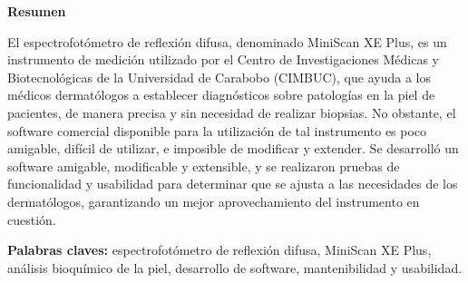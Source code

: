 \begin{center}
	\membrete
	\vfill
	\textbf{Resumen}
\end{center}

	\noindent
El espectrofot\'{o}metro de reflexi\'{o}n difusa, denominado MiniScan XE Plus, es un instrumento de medici\'{o}n utilizado por el Centro de Investigaciones M\'{e}dicas y Biotecnol\'{o}gicas de la Universidad de Carabobo (CIMBUC), que ayuda a los m\'{e}dicos dermat\'{o}logos a establecer diagn\'{o}sticos sobre patolog\'{i}as en la piel de pacientes, de manera precisa y sin necesidad de realizar biopsias. No obstante, el software comercial disponible para la utilizaci\'{o}n de tal instrumento es poco amigable, dif\'{i}cil de utilizar, e imposible de modificar y extender. Se desarroll\'{o} un software amigable, modificable y extensible, y se realizaron pruebas de funcionalidad y usabilidad para determinar que se ajusta a las necesidades de los dermat\'{o}logos, garantizando un mejor aprovechamiento del instrumento en cuesti\'{o}n.

	\noindent
	\textbf{Palabras claves:} espectrofot\'{o}metro de reflexi\'{o}n difusa, MiniScan XE Plus, an\'{a}lisis bioqu\'{i}mico de la piel, desarrollo de software, mantenibilidad y usabilidad.

\vfill
\begin{minipage}[t]{0.45\textwidth}
	\begin{flushleft}
		\begin{center}
			\autor
		\end{center}
	\end{flushleft}
\end{minipage}
\begin{minipage}[t]{0.45\textwidth}
	\begin{flushright}
		\begin{center}
			\tutores
		\end{center}
	\end{flushright}
\end{minipage}
\vfill